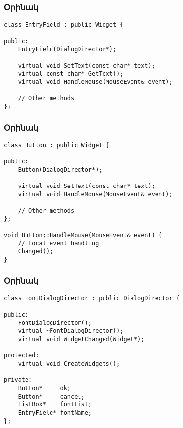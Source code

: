\documentclass{beamer}
\begin{document}
\begin{frame}[fragile]\frametitle{Օրինակ}
\begin{english}
\begin{verbatim}
class EntryField : public Widget {

public:
    EntryField(DialogDirector*);

    virtual void SetText(const char* text);
    virtual const char* GetText();
    virtual void HandleMouse(MouseEvent& event);

    // Other methods
};
\end{verbatim}
\end{english}
\end{frame}

\begin{frame}[fragile]\frametitle{Օրինակ}
\begin{english}
\begin{verbatim}
class Button : public Widget {

public:
    Button(DialogDirector*);

    virtual void SetText(const char* text);
    virtual void HandleMouse(MouseEvent& event);

    // Other methods
};

void Button::HandleMouse(MouseEvent& event) {
    // Local event handling
    Changed();
}
\end{verbatim}
\end{english}
\end{frame}

\begin{frame}[fragile]\frametitle{Օրինակ}
\begin{english}
\begin{verbatim}
class FontDialogDirector : public DialogDirector {

public:
    FontDialogDirector();
    virtual ~FontDialogDirector();
    virtual void WidgetChanged(Widget*);

protected:
    virtual void CreateWidgets();

private:
    Button*     ok;
    Button*     cancel;
    ListBox*    fontList;
    EntryField* fontName;
};
\end{verbatim}
\end{english}
\end{frame}
\end{document}

